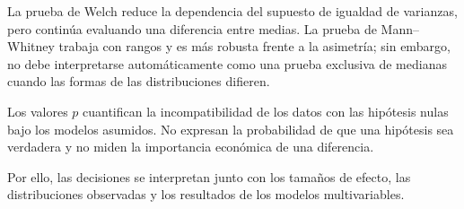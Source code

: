 La prueba de Welch reduce la dependencia del supuesto de igualdad de
varianzas, pero continúa evaluando una diferencia entre medias. La prueba
de Mann--Whitney trabaja con rangos y es más robusta frente a la
asimetría; sin embargo, no debe interpretarse automáticamente como una
prueba exclusiva de medianas cuando las formas de las distribuciones
difieren.

Los valores \(p\) cuantifican la incompatibilidad de los datos con las
hipótesis nulas bajo los modelos asumidos. No expresan la probabilidad de
que una hipótesis sea verdadera y no miden la importancia económica de
una diferencia.

Por ello, las decisiones se interpretan junto con los tamaños de efecto,
las distribuciones observadas y los resultados de los modelos
multivariables.


